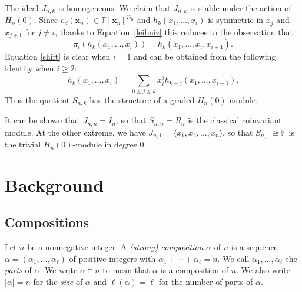 \documentclass[10pt]{amsart}
\theoremstyle{definition}
\newcommand{\symm}{{\mathfrak{S}}}
\newcommand{\FF}{{\mathbb{F}}}
\newcommand{\xx}{{\mathbf {x}}}
\begin{document}
The ideal $J_{n,k}$ is homogeneous.
We claim that $J_{n,k}$ is stable under the action of $H_n(0)$.  Since $e_d(\xx_n) \in \FF[\xx_n]^{\symm_n}$
and $h_k(x_1, \dots, x_i)$ is symmetric in $x_j$ and $x_{j+1}$ for $j \neq i$, 
thanks to Equation~\eqref{leibniz} this reduces to the observation that
\begin{equation}\label{shift}
\pi_i(h_k(x_1, \dots, x_i)) = h_k(x_1, \dots, x_i, x_{i+1}).
\end{equation}
Equation \eqref{shift} is clear when $i=1$ and can be obtained from the following identity when $i\ge2$:
\begin{equation}
h_k(x_1,\ldots,x_i) = \sum_{0\le j\le k} x_i^j h_{k-j}(x_1,\ldots,x_{i-1}). 
\end{equation}
Thus the quotient
$S_{n,k}$ has the structure of a graded $H_n(0)$-module.


It can be shown that $J_{n,n} = I_n$, so that $S_{n,n} = R_n$ is the classical coinvariant module.  
At the other extreme, we have $J_{n,1} = \langle x_1, x_2, \dots, x_n \rangle$, so that 
$S_{n,1} \cong \FF$ is the trivial $H_n(0)$-module in degree $0$.
\section{Background}
\label{Background}


\subsection{Compositions}
Let $n$ be a nonnegative integer.
A \emph{(strong) composition} $\alpha$ of $n$ is a sequence
$\alpha = (\alpha_1, \dots, \alpha_{\ell})$ of positive integers with $\alpha_1 + \cdots + \alpha_{\ell} = n$.
We call $\alpha_1,\ldots,\alpha_\ell$ the \emph{parts} of $\alpha$.
We write $\alpha \models n$ to mean that $\alpha$ is a  composition of $n$.
We also write $|\alpha| = n$ for the \emph{size} of $\alpha$ and $\ell(\alpha) = \ell$ for the number  of parts of $\alpha$.
\end{document}

